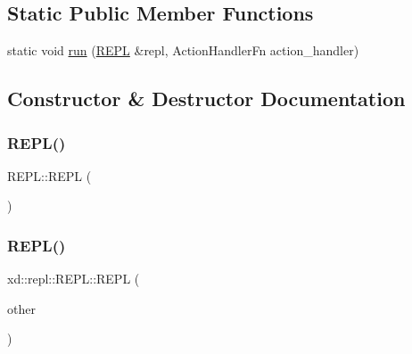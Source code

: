 \subsection*{Static Public Member Functions}
\begin{DoxyCompactItemize}
\item 
static void \mbox{\hyperlink{classxd_1_1repl_1_1_r_e_p_l_aeb27639fc9ace00650f4bf22c132e079}{run}} (\mbox{\hyperlink{classxd_1_1repl_1_1_r_e_p_l}{R\+E\+PL}} \&repl, Action\+Handler\+Fn action\+\_\+handler)
\end{DoxyCompactItemize}


\subsection{Constructor \& Destructor Documentation}
\mbox{\label{classxd_1_1repl_1_1_r_e_p_l_a2e1d89ef893914e2384d0aa1baff3fdc}} 
\subsubsection{\texorpdfstring{R\+E\+P\+L()}{REPL()}\hspace{0.1cm}{\footnotesize\ttfamily [1/2]}}
{\footnotesize\ttfamily R\+E\+P\+L\+::\+R\+E\+PL (\begin{DoxyParamCaption}{ }\end{DoxyParamCaption})}

\mbox{\label{classxd_1_1repl_1_1_r_e_p_l_a8aea04977aafea7c131eb71650700f61}} 
\subsubsection{\texorpdfstring{R\+E\+P\+L()}{REPL()}\hspace{0.1cm}{\footnotesize\ttfamily [2/2]}}
{\footnotesize\ttfamily xd\+::repl\+::\+R\+E\+P\+L\+::\+R\+E\+PL (\begin{DoxyParamCaption}\item[{const \mbox{\hyperlink{classxd_1_1repl_1_1_r_e_p_l}{R\+E\+PL}} \&}]{other }\end{DoxyParamCaption})\hspace{0.3cm}{\ttfamily [delete]}}



